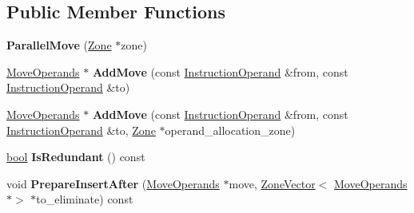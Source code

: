 \subsection*{Public Member Functions}
\begin{DoxyCompactItemize}
\item 
\mbox{\label{classv8_1_1internal_1_1compiler_1_1ParallelMove_aed2ca933d925ca250be848dc259c346e}} 
{\bfseries Parallel\+Move} (\mbox{\hyperlink{classv8_1_1internal_1_1Zone}{Zone}} $\ast$zone)
\item 
\mbox{\label{classv8_1_1internal_1_1compiler_1_1ParallelMove_aaf0c874d2238b471f1fdfd94ff8b7245}} 
\mbox{\hyperlink{classv8_1_1internal_1_1compiler_1_1MoveOperands}{Move\+Operands}} $\ast$ {\bfseries Add\+Move} (const \mbox{\hyperlink{classv8_1_1internal_1_1compiler_1_1InstructionOperand}{Instruction\+Operand}} \&from, const \mbox{\hyperlink{classv8_1_1internal_1_1compiler_1_1InstructionOperand}{Instruction\+Operand}} \&to)
\item 
\mbox{\label{classv8_1_1internal_1_1compiler_1_1ParallelMove_a814609dc9d73a7e4c4ff72951d8e2d16}} 
\mbox{\hyperlink{classv8_1_1internal_1_1compiler_1_1MoveOperands}{Move\+Operands}} $\ast$ {\bfseries Add\+Move} (const \mbox{\hyperlink{classv8_1_1internal_1_1compiler_1_1InstructionOperand}{Instruction\+Operand}} \&from, const \mbox{\hyperlink{classv8_1_1internal_1_1compiler_1_1InstructionOperand}{Instruction\+Operand}} \&to, \mbox{\hyperlink{classv8_1_1internal_1_1Zone}{Zone}} $\ast$operand\+\_\+allocation\+\_\+zone)
\item 
\mbox{\label{classv8_1_1internal_1_1compiler_1_1ParallelMove_a0ecdc8451787c27950361ccf78943adb}} 
\mbox{\hyperlink{classbool}{bool}} {\bfseries Is\+Redundant} () const
\item 
\mbox{\label{classv8_1_1internal_1_1compiler_1_1ParallelMove_a7c3bb4acfa5060ddb36850a1e13b5aaa}} 
void {\bfseries Prepare\+Insert\+After} (\mbox{\hyperlink{classv8_1_1internal_1_1compiler_1_1MoveOperands}{Move\+Operands}} $\ast$move, \mbox{\hyperlink{classv8_1_1internal_1_1ZoneVector}{Zone\+Vector}}$<$ \mbox{\hyperlink{classv8_1_1internal_1_1compiler_1_1MoveOperands}{Move\+Operands}} $\ast$$>$ $\ast$to\+\_\+eliminate) const
\end{DoxyCompactItemize}


